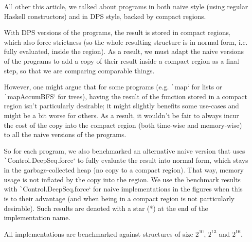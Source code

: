\documentclass[english]{jflart}
\begin{document}
All other this article, we talked about programs in both naive style (using regular Haskell constructors) and in DPS style, backed by compact regions.

With DPS versions of the programs, the result is stored in compact regions, which also force strictness (so the whole resulting structure is in normal form, i.e. fully evaluated, inside the region). As a result, we must adapt the naive versions of the programs to add a copy of their result inside a compact region as a final step, so that we are comparing comparable things.

However, one might argue that for some programs (e.g. \texttt`map` for lists or \texttt`mapAccumBFS` for trees), having the result of the function stored in a compact region isn't particularly desirable; it might slightly benefits some use-cases and might be a bit worse for others. As a result, it wouldn't be fair to always incur the cost of the copy into the compact region (both time-wise and memory-wise) to all the naive versions of the programs.

So for each program, we also benchmarked an alternative naive version that uses \texttt`Control.DeepSeq.force` to fully evaluate the result into normal form, which stays in the garbage-collected heap (no copy to a compact region). That way, memory usage is not inflated by the copy into the region. We use the benchmark results with \texttt`Control.DeepSeq.force` for naive implementations in the figures when this is to their advantage (and when being in a compact region is not particularly desirable). Such results are denoted with a star (*) at the end of the implementation name.

All implementations are benchmarked against structures of size $2^{10}$, $2^{13}$ and $2^{16}$.
\end{document}
